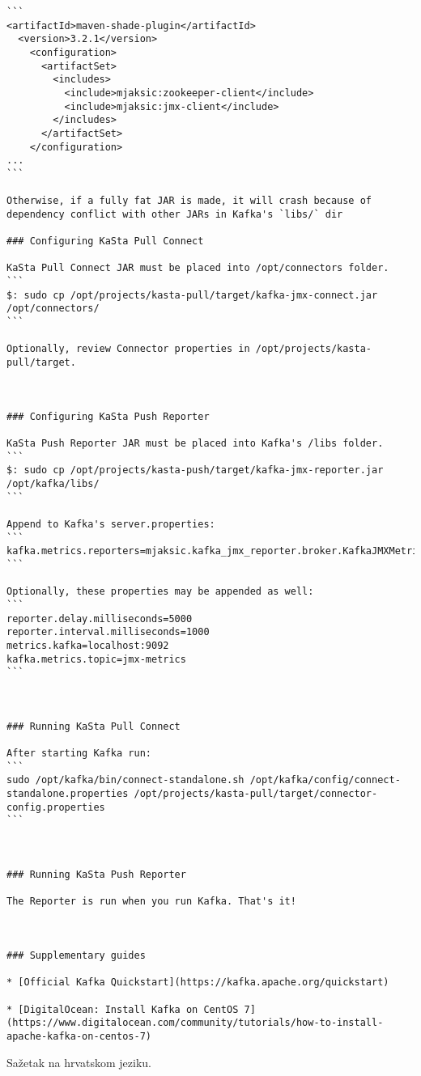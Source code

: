 \documentclass[times, utf8, diplomski, numeric]{fer}
\begin{document}
\begin{lstlisting}[breaklines]
```
<artifactId>maven-shade-plugin</artifactId>
  <version>3.2.1</version>
    <configuration>
      <artifactSet>
        <includes>
          <include>mjaksic:zookeeper-client</include>
          <include>mjaksic:jmx-client</include>
        </includes>
      </artifactSet>
    </configuration>
...
```

Otherwise, if a fully fat JAR is made, it will crash because of dependency conflict with other JARs in Kafka's `libs/` dir

### Configuring KaSta Pull Connect

KaSta Pull Connect JAR must be placed into /opt/connectors folder.
```
$: sudo cp /opt/projects/kasta-pull/target/kafka-jmx-connect.jar /opt/connectors/
```

Optionally, review Connector properties in /opt/projects/kasta-pull/target.



### Configuring KaSta Push Reporter

KaSta Push Reporter JAR must be placed into Kafka's /libs folder.
```
$: sudo cp /opt/projects/kasta-push/target/kafka-jmx-reporter.jar /opt/kafka/libs/
```

Append to Kafka's server.properties:
```
kafka.metrics.reporters=mjaksic.kafka_jmx_reporter.broker.KafkaJMXMetricsReporter
```

Optionally, these properties may be appended as well:
```
reporter.delay.milliseconds=5000
reporter.interval.milliseconds=1000
metrics.kafka=localhost:9092
kafka.metrics.topic=jmx-metrics
```



### Running KaSta Pull Connect

After starting Kafka run:  
```
sudo /opt/kafka/bin/connect-standalone.sh /opt/kafka/config/connect-standalone.properties /opt/projects/kasta-pull/target/connector-config.properties
```



### Running KaSta Push Reporter

The Reporter is run when you run Kafka. That's it!  



### Supplementary guides

* [Official Kafka Quickstart](https://kafka.apache.org/quickstart)

* [DigitalOcean: Install Kafka on CentOS 7](https://www.digitalocean.com/community/tutorials/how-to-install-apache-kafka-on-centos-7)

\end{lstlisting}




\begin{sazetak}
Sažetak na hrvatskom jeziku.

\end{sazetak}

\begin{abstract}
Abstract.

\end{abstract}
\end{document}
